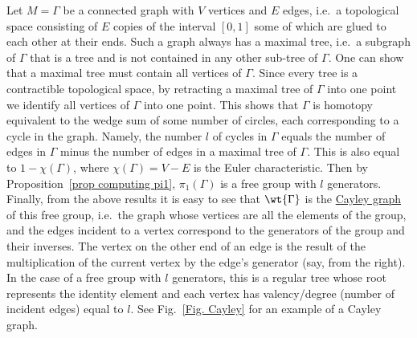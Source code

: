 \begin{example}
    Let $M=\Gamma$ be a connected graph with $V$ vertices and $E$ edges, i.e.\ a topological space consisting of $E$ copies of the interval $[0,1]$ some of which are glued to each other at their ends. Such a graph always has a maximal tree, i.e.\ a subgraph of $\Gamma$ that is a tree and is not contained in any other sub-tree of $\Gamma$. One can show that a maximal tree must contain all vertices of $\Gamma$. Since every tree is a contractible topological space, by retracting a maximal tree of $\Gamma$ into one point we identify all vertices of $\Gamma$ into one point. This shows that $\Gamma$ is homotopy equivalent to the wedge sum of some number of circles, each corresponding to a cycle in the graph. Namely, the number $l$ of cycles in $\Gamma$ equals the number of edges in $\Gamma$ minus the number of edges in a maximal tree of $\Gamma$. This is also equal to $1-\chi(\Gamma)$, where $\chi(\Gamma)=V-E$ is the Euler characteristic. Then by Proposition~\ref{prop computing pi1}, $\pi_1(\Gamma)$  is a free group with $l$ generators. Finally, from the above results it is easy to see that $\wt{\Gamma}$ is the \href{https://en.wikipedia.org/wiki/Cayley_graph}{Cayley graph} of this free group, i.e.\ the graph whose vertices are all the elements of the group, and the edges incident to a vertex correspond to the generators of the group and their inverses. The vertex on the other end of an edge is the result of the multiplication of the current vertex by the edge's generator (say, from the right). In the case of a free group with $l$ generators, this is a regular tree whose root represents the identity element and each vertex has valency/degree (number of incident edges) equal to $l$. See Fig.~\ref{Fig. Cayley} for an example of a Cayley graph.
\end{example}
